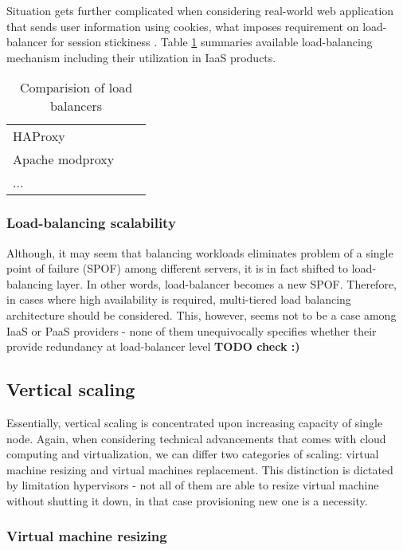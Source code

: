Situation gets further complicated when considering real-world web application that sends user information using cookies, what imposes requirement on load-balancer for session stickiness \cite{StBaMa11}. Table \ref{tab:load-balancers} summaries available load-balancing mechanism including their utilization in IaaS products.

\begin{table}[!htbp]
\begin{tabularx}{\textwidth}{l | X | X}
 &  & \\
\hline 
HAProxy &  & \\
\hline
Apache modproxy &  & \\
\hline
... &  & \\
\end{tabularx}
\caption{Comparision of load balancers}
\label{tab:load-balancers}
\end{table}

\subsubsection*{Load-balancing scalability}
Although, it may seem that balancing workloads eliminates problem of a single point of failure (SPOF) among different servers, it is in fact shifted to load-balancing layer. In other words, load-balancer becomes a new SPOF. Therefore, in cases where high availability is required, multi-tiered load balancing architecture should be considered. This, however, seems not to be a case among IaaS or PaaS providers - none of them unequivocally specifies whether their provide redundancy at load-balancer level \textbf{TODO check :)}

\subsection{Vertical scaling}

Essentially, vertical scaling is concentrated upon increasing capacity of single node. Again, when considering technical advancements that comes with cloud computing and virtualization, we can differ two categories of scaling: virtual machine resizing and virtual machines replacement. This distinction is dictated by limitation hypervisors - not all of them are able to resize virtual machine without shutting it down, in that case provisioning new one is a necessity.

\subsubsection*{Virtual machine resizing}




